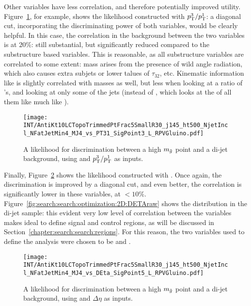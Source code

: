 

Other variables have less correlation, and therefore potentially improved utility. Figure~\ref{fig:search:search:optimization:2D:PT31}, for example, shows the likelihood constructed with $p_{\text{T}}^3/p_{\text{T}}^1$: a diagonal cut, incorporating the discriminating power of both variables, would be clearly helpful. In this case, the correlation in the background between the two variables is at $20\%$: still substantial, but significantly reduced compared to the substructure based variables. This is reasonable, as all substructure variables are correlated to some extent: mass arises from the presence of wild angle radiation, which also causes extra subjets or lower talues of $\tau_{32}$, etc. Kinematic information like \pt is slightly correlated with masses as well, but less when looking at a ratio of \pt's, and looking at only some of the jets (instead of \Ht, which looks at the \pt of all them like much like \MJ).


\begin{figure}
\centering
\texttt{[image: INT/AntiKt10LCTopoTrimmedPtFrac5SmallR30\_j145\_ht500\_NjetIncl\_NFatJetMin4\_MJ4\_vs\_PT31\_SigPoint3\_L\_RPVGluino.pdf]}
\label{fig:search:search:optimization:2D:PT31}
\caption{A likelihood for discrimination between a high $m_{\tilde{g}}$ point and a \herwigpp di-jet background, using \MJ and $p_{\text{T}}^3/p_{\text{T}}^1$ as inputs.}
\end{figure}


Finally, Figure~\ref{fig:search:search:optimization:2D:DETA} shows the likelihood constructed with \Deta. Once again, the discrimination is improved by a diagonal cut, and even better, the correlation is significantly lower in these variables, at $<10\%$. Figure~\ref{fig:search:search:optimization:2D:DETAraw} shows the distribution in the \herwigpp di-jet sample: this evident very low level of correlation between the variables makes \Deta ideal to define signal and control regions, as will be discussed in Section~\ref{chapter:search:search:regions}. For this reason, the two variables used to define the analysis were chosen to be \MJ and \Deta.


\begin{figure}
\centering
\texttt{[image: INT/AntiKt10LCTopoTrimmedPtFrac5SmallR30\_j145\_ht500\_NjetIncl\_NFatJetMin4\_MJ4\_vs\_DEta\_SigPoint5\_L\_RPVGluino.pdf]}
\label{fig:search:search:optimization:2D:DETA}
\caption{A likelihood for discrimination between a high $m_{\tilde{g}}$ point and a \herwigpp di-jet background, using \MJ and $\Delta \eta$ as inputs.}
\end{figure}

